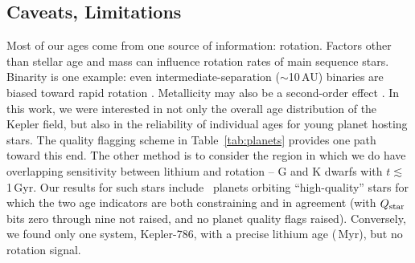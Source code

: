 \documentclass[11pt,twocolumn,tighten]{aastex63}
\begin{document}
%




\subsection{Caveats, Limitations}

Most of our ages come from one source of information: rotation.
Factors other than stellar age and mass can influence rotation rates
of main sequence stars.  Binarity is one example: even
intermediate-separation ($\sim$10\,AU) binaries are biased toward
rapid rotation \citep[e.g.][and many studies thereafter]{Meibom_2007}.
Metallicity may also be a second-order effect
\citep{2020MNRAS.499.3481A,2024arXiv240500779S}.  In this work, we
were interested in not only the overall age distribution of the Kepler
field, but also in the reliability of individual ages for young planet
hosting stars.  The quality flagging scheme in Table~\ref{tab:planets}
provides one path toward this end.  The other method is to consider
the region in which we do have overlapping sensitivity between lithium
and rotation -- G and K dwarfs with $t$$\lesssim$1\,Gyr.  Our results
for such stars include \ltonegyrhighqconfirmedtwosided\ planets
orbiting ``high-quality'' stars for which the two age indicators are
both constraining and in agreement (with $Q_{\rm star}$ bits zero
through nine not raised, and no planet quality flags raised).
Conversely, we found only one system, Kepler-786, with a precise
lithium age (\kepseveneightsix\,Myr), but no rotation signal.
\end{document}
